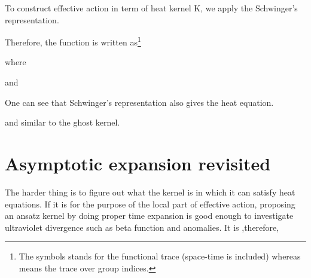 \documentclass[a4paper,12 pt]{article}
\begin{document}
To construct effective action in term of heat kernel K, we apply
the Schwinger's representation.
\begin{center}
 \coordHE{}
\end{center}
Therefore, the \coordHE{} function is written as\footnote{The symbols
\coordHE{} stands for the functional trace (space-time is included)
whereas \coordHE{} means the trace over group indices.}
\begin{center}
\coordHE{}
\end{center}
where
\begin{center}
\coordHE{}
\end{center}
and
\begin{center}
\coordHE{}
 \end{center}
One can see that Schwinger's representation also gives the heat
equation.
 \begin{center}
 \coordHE{}
\end{center}
and similar to the ghost kernel.

\section{Asymptotic expansion revisited}

The harder thing is to figure out what the kernel \coordHE{} is in which
it can satisfy heat equations. If it is for the purpose of the
local part of effective action, proposing an ansatz kernel \coordHE{} by
doing proper time expansion is good enough to investigate
ultraviolet divergence such as beta function and anomalies. It is
,therefore,
\end{document}
